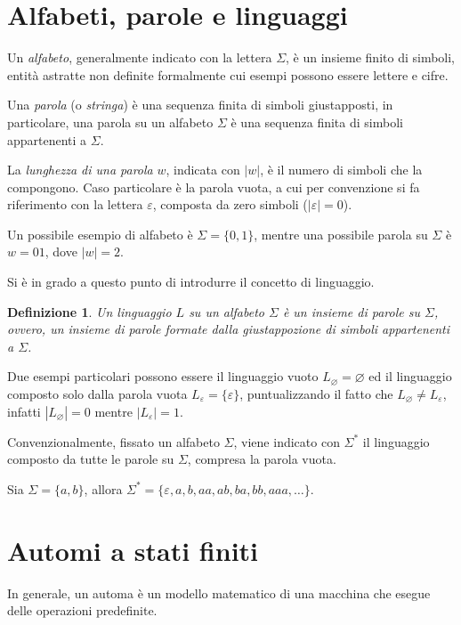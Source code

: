 \documentclass[a4paper,12pt]{report} %
\newtheorem{definition}{Definizione}[chapter] %
\begin{document}
\section{Alfabeti, parole e linguaggi}

Un \emph{alfabeto}, generalmente indicato con la lettera $\Sigma$, è un insieme finito di simboli,
entità astratte non definite formalmente cui esempi possono essere lettere e cifre.

Una \emph{parola} (o \emph{stringa}) è una sequenza finita di simboli giustapposti, in particolare, una parola su un alfabeto $\Sigma$
è una sequenza finita di simboli appartenenti a $\Sigma$.

La \emph{lunghezza di una parola} $w$, indicata con $|w|$, è il numero di simboli che la compongono.
Caso particolare è la parola vuota, a cui per convenzione si fa riferimento con la lettera $\varepsilon$,
composta da zero simboli ($|\varepsilon| = 0$).

Un possibile esempio di alfabeto è $\Sigma = \{0, 1\}$, mentre una possibile parola su $\Sigma$ è
$w = 01$, dove $|w| = 2$.

Si è in grado a questo punto di introdurre il concetto di linguaggio.

\begin{definition}\label{def:lang}
  Un \emph{linguaggio} $L$ su un alfabeto $\Sigma$ è un insieme di parole su $\Sigma$, ovvero, un insieme di
  parole formate dalla giustappozione di simboli appartenenti a $\Sigma$.
\end{definition}

Due esempi particolari possono essere il linguaggio vuoto $L_\varnothing = \varnothing$ ed il linguaggio composto
solo dalla parola vuota $L_\varepsilon = \{\varepsilon\}$, puntualizzando il fatto che $L_\varnothing \neq L_\varepsilon$,
infatti $|L_\varnothing| = 0$ mentre $|L_\varepsilon| = 1$.

Convenzionalmente, fissato un alfabeto $\Sigma$, viene indicato con $\Sigma^*$ il linguaggio composto da tutte
le parole su $\Sigma$, compresa la parola vuota.

Sia $\Sigma = \{a, b\}$, allora $\Sigma^* = \{\varepsilon, a, b, aa, ab, ba, bb, aaa, \dots\}$.

\section{Automi a stati finiti}

In generale, un automa è un modello matematico di una macchina che esegue delle operazioni predefinite.
\end{document}
